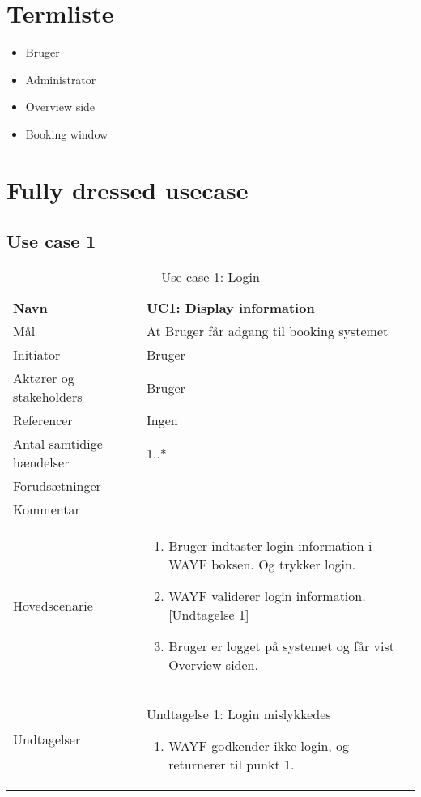 



\section*{Termliste}
\begin{itemize}
\item Bruger
\item Administrator
\item Overview side
\item Booking window
\end{itemize}


\section{Fully dressed usecase}

\subsection{Use case 1}
\begin{table}[H]
	\centering
    \begin{tabular}{ l | p{9.6cm} }
    \toprule
    \textbf{Navn} & \textbf{UC1: Display information}						\\\otoprule
    Mål			& At Bruger får adgang til booking systemet			 	\\\hline
    Initiator 	& Bruger 												\\\hline
    Aktører og stakeholders 	& Bruger										\\\hline
    Referencer 				& Ingen 										\\\hline
    Antal samtidige hændelser 	& 1..*									\\\hline
    Forudsætninger 				& \vspace{-2mm}							\\\hline
    Kommentar 					& 	 									\\\hline
    Hovedscenarie 				& 
    \begin{enumerate}
    	\item Bruger indtaster login information i WAYF boksen. Og trykker login. 
    	\item WAYF validerer login information.
    	[Undtagelse 1]
    	\item Bruger er logget på systemet og får vist Overview siden. 
	\end{enumerate} 														\\\hline
	
    Undtagelser 			&
 	Undtagelse 1: Login mislykkedes
        \begin{enumerate}
        	\item WAYF godkender ikke login, og returnerer til punkt 1.
        \end{enumerate}
\\\bottomrule
    \end{tabular}
    \caption{Use case 1: Login}
    \label{tab:use case 1}
\end{table}



